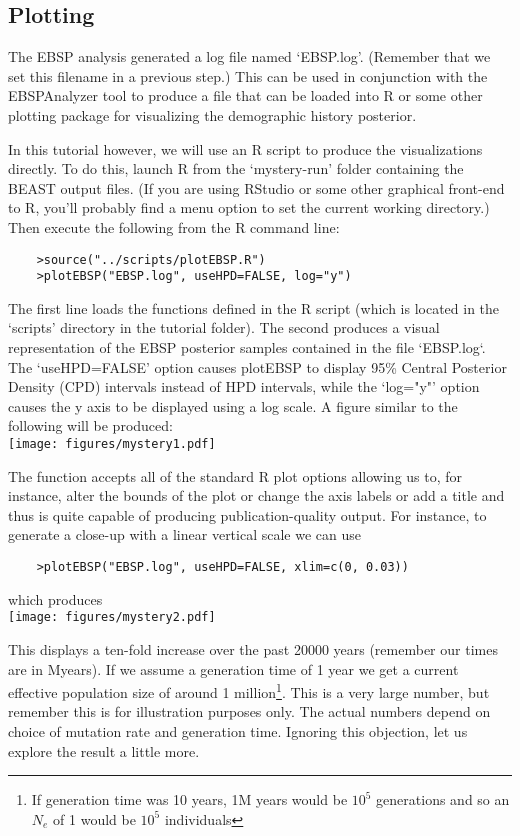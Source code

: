 \documentclass[a4paper,11pt]{article}
\begin{document}
\subsection{Plotting}

The EBSP analysis generated a log file named `EBSP.log'.  (Remember that we set
this filename in a previous step.)  This can be used in conjunction with the
EBSPAnalyzer tool to produce a file that can be loaded into R or some other
plotting package for visualizing the demographic history posterior.

In this tutorial however, we will use an R script to produce the visualizations
directly. To do this, launch R from the `mystery-run' folder containing the
BEAST output files. (If you are using RStudio or some other graphical front-end
to R, you'll probably find a menu option to set the current working directory.)
Then execute the following from the R command line:
\begin{verbatim}
    >source("../scripts/plotEBSP.R")
    >plotEBSP("EBSP.log", useHPD=FALSE, log="y")
\end{verbatim}

The first line loads the functions defined in the R script (which is located in
the `scripts' directory in the tutorial folder). The second produces a visual
representation of the EBSP posterior samples contained in the file `EBSP.log`.
The `useHPD=FALSE' option causes plotEBSP to display 95\% Central Posterior
Density (CPD) intervals instead of HPD intervals, while the `log="y"' option
causes the y axis to be displayed using a log scale.  A figure similar to the
following will be produced:\\
\texttt{[image: figures/mystery1.pdf]}

The function accepts all of the standard R plot options allowing us to, for
instance, alter the bounds of the plot or change the axis labels or add a title
and thus is quite capable of producing publication-quality output.  For
instance, to generate a close-up with a linear vertical scale we can use
\begin{verbatim}
    >plotEBSP("EBSP.log", useHPD=FALSE, xlim=c(0, 0.03))
\end{verbatim}
which produces\\
\texttt{[image: figures/mystery2.pdf]}

This displays a ten-fold increase over the past 20000 years (remember our times
are in Myears). If we assume a generation time of 1 year we get a current
effective population size of around 1 million\footnote{If generation time was
    10 years, 1M years would be $10^5$ generations and so an $N_e$ of 1 would
    be $10^5$ individuals}. This is a very large number, but remember this is
for illustration purposes only. The actual numbers depend on choice of mutation
rate and generation time. Ignoring this objection, let us explore the result a
little more.
\end{document}
